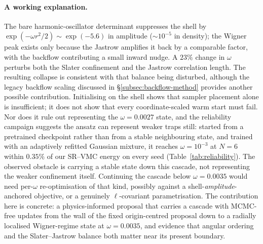 \paragraph{A working explanation.} The bare harmonic-oscillator determinant suppresses
the shell by $\exp(-\omega r^2/2)\!\sim\!\exp(-5.6)$ in amplitude ($\sim\!10^{-5}$ in density);
the Wigner peak exists only because the Jastrow amplifies it back by a comparable factor, with
the backflow contributing a small inward nudge. A $23\%$ change in $\omega$ perturbs both the
Slater confinement and the Jastrow correlation length. The resulting collapse is consistent
with that balance being disturbed, although the legacy backflow scaling discussed in
\S\ref{subsec:backflow-method} provides another possible contribution. Initialising on the shell shows
that sampler placement alone is insufficient; it does not show that every coordinate-scaled
warm start must fail. Nor does it rule out representing the
$\omega=0.0027$ state, and the reliability campaign suggests the ansatz can represent weaker
traps still: started from a pretrained checkpoint rather than from a stable neighbouring state, and
trained with an adaptively refitted Gaussian mixture, it reaches $\omega=10^{-3}$ at $N{=}6$
within $0.35\%$ of our SR--VMC energy on every seed (Table~\ref{tab:reliability}). The
observed obstacle is carrying a stable state down this cascade, not representing the weaker
confinement itself.
Continuing the cascade below $\omega=0.0035$ would need per-$\omega$ re-optimisation of that
kind, possibly against a shell-\emph{amplitude}-anchored objective, or a genuinely
$\ell$-covariant parametrisation. The contribution here is concrete: a physics-informed
proposal that carries a cascade with MCMC-free updates from the wall of the fixed origin-centred
proposal down to a radially localised Wigner-regime state at $\omega=0.0035$,
and evidence that angular ordering and the Slater--Jastrow balance both matter near its
present boundary.

